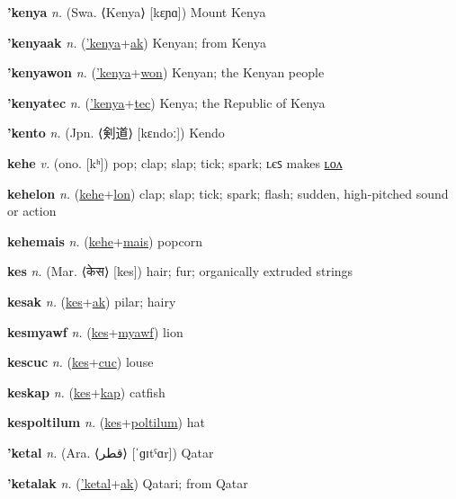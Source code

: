 \textbf{\hypertarget{'kenya}{'kenya}} \textit{n.} (Swa. ⟨Kenya⟩ [kɛɲɑ])
Mount Kenya

\textbf{\hypertarget{'kenyaak}{'kenyaak}} \textit{n.} (\hyperlink{'kenya}{'kenya}+\allowbreak \hyperlink{ak}{ak})
Kenyan; from Kenya

\textbf{\hypertarget{'kenyawon}{'kenyawon}} \textit{n.} (\hyperlink{'kenya}{'kenya}+\allowbreak \hyperlink{won}{won})
Kenyan; the Kenyan people

\textbf{\hypertarget{'kenyatec}{'kenyatec}} \textit{n.} (\hyperlink{'kenya}{'kenya}+\allowbreak \hyperlink{tec}{tec})
Kenya; the Republic of Kenya

\textbf{\hypertarget{'kento}{'kento}} \textit{n.} (Jpn. ⟨{\japanese{}剣道}⟩ [kɛndoː])
Kendo

\textbf{\hypertarget{kehe}{kehe}} \textit{v.} (ono. [kʰ])
pop; clap; slap; tick; spark; ʟєꜱ makes \hyperlink{kehelon}{ʟᴏᴧ}

\textbf{\hypertarget{kehelon}{kehelon}} \textit{n.} (\hyperlink{kehe}{kehe}+\allowbreak \hyperlink{lon}{lon})
clap; slap; tick; spark; flash; sudden, high-pitched sound or action

\textbf{\hypertarget{kehemais}{kehemais}} \textit{n.} (\hyperlink{kehe}{kehe}+\allowbreak \hyperlink{mais}{mais})
popcorn

\textbf{\hypertarget{kes}{kes}} \textit{n.} (Mar. ⟨{\devanagari{}केस}⟩ [kes])
hair; fur; organically extruded strings

\textbf{\hypertarget{kesak}{kesak}} \textit{n.} (\hyperlink{kes}{kes}+\allowbreak \hyperlink{ak}{ak})
pilar; hairy

\textbf{\hypertarget{kesmyawf}{kesmyawf}} \textit{n.} (\hyperlink{kes}{kes}+\allowbreak \hyperlink{myawf}{myawf})
lion

\textbf{\hypertarget{kescuc}{kescuc}} \textit{n.} (\hyperlink{kes}{kes}+\allowbreak \hyperlink{cuc}{cuc})
louse

\textbf{\hypertarget{keskap}{keskap}} \textit{n.} (\hyperlink{kes}{kes}+\allowbreak \hyperlink{kap}{kap})
catfish

\textbf{\hypertarget{kespoltilum}{kespoltilum}} \textit{n.} (\hyperlink{kes}{kes}+\allowbreak \hyperlink{poltilum}{poltilum})
hat

\textbf{\hypertarget{'ketal}{'ketal}} \textit{n.} (Ara. ⟨{\arabics{}قطر‎}⟩ [ˈɡɪtˤɑr])
Qatar

\textbf{\hypertarget{'ketalak}{'ketalak}} \textit{n.} (\hyperlink{'ketal}{'ketal}+\allowbreak \hyperlink{ak}{ak})
Qatari; from Qatar

